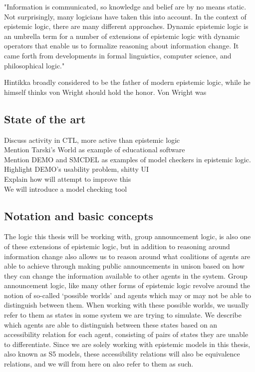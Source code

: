 "Information is communicated, so knowledge and belief are by no means static.
Not surprisingly, many logicians have taken this into account. In the context of
epistemic logic, there are many different approaches. Dynamic epistemic logic
is an umbrella term for a number of extensions of epistemic logic with dynamic
operators that enable us to formalize reasoning about information change. It
came forth from developments in formal linguistics, computer science, and
philosophical logic."\cite{Ditmarsch2007}


Hintikka broadly considered to be the father of modern epistemic logic, while he himself thinks von Wright should hold the honor. Von Wright was 

\subsection{State of the art}


Discuss activity in CTL, more active than epistemic logic\\
Mention Tarski's World as example of educational software\\
Mention DEMO and SMCDEL as examples of model checkers in epistemic logic.\\
Highlight DEMO's usability problem, shitty UI\\
Explain how \cname{} will attempt to improve this\\

We will introduce a model checking tool 

\subsection{Notation and basic concepts}

The logic this thesis will be working with, group announcement logic, is also one of these extensions of epistemic logic, but in addition to reasoning around information change also allows us to reason around what coalitions of agents are able to achieve through making public announcements in unison based on how they can change the information available to other agents in the system. Group announcement logic, like many other forms of epistemic logic revolve around the notion of so-called `possible worlds' and agents which may or may not be able to distinguish between them. When working with these possible worlds, we usually refer to them as states in some system we are trying to simulate. We describe which agents are able to distinguish between these states based on an accessibility relation for each agent, consisting of pairs of states they are unable to differentiate. Since we are solely working with epistemic models in this thesis, also known as S5 models, these accessibility relations will also be equivalence relations, and we will from here on also refer to them as such.

